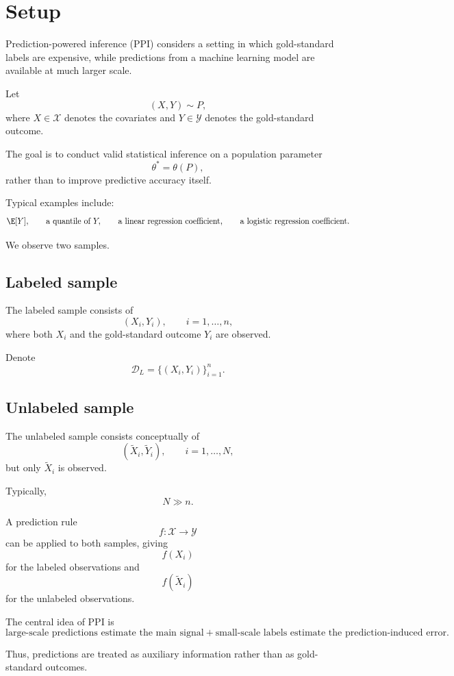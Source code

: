 \section{Setup}

Prediction-powered inference (PPI) considers a setting in which
gold-standard labels are expensive, while predictions from a machine
learning model are available at much larger scale.

Let
\[
(X,Y) \sim P,
\]
where $X \in \mathcal{X}$ denotes the covariates and $Y \in \mathcal{Y}$
denotes the gold-standard outcome.

The goal is to conduct valid statistical inference on a population
parameter
\[
\theta^* = \theta(P),
\]
rather than to improve predictive accuracy itself.

Typical examples include:
\[
\E[Y],
\qquad
\text{a quantile of } Y,
\qquad
\text{a linear regression coefficient},
\qquad
\text{a logistic regression coefficient}.
\]

We observe two samples.

\subsection{Labeled sample}

The labeled sample consists of
\[
(X_i,Y_i), \qquad i=1,\ldots,n,
\]
where both $X_i$ and the gold-standard outcome $Y_i$ are observed.

Denote
\[
\mathcal{D}_{L}
=
\{(X_i,Y_i)\}_{i=1}^n.
\]

\subsection{Unlabeled sample}

The unlabeled sample consists conceptually of
\[
(\widetilde X_i,\widetilde Y_i),
\qquad i=1,\ldots,N,
\]
but only $\widetilde X_i$ is observed.

Typically,
\[
N \gg n.
\]

A prediction rule
\[
f:\mathcal{X}\rightarrow\mathcal{Y}
\]
can be applied to both samples, giving
\[
f(X_i)
\]
for the labeled observations and
\[
f(\widetilde X_i)
\]
for the unlabeled observations.

The central idea of PPI is
\[
\boxed{
\text{large-scale predictions estimate the main signal}
+
\text{small-scale labels estimate the prediction-induced error}.
}
\]

Thus, predictions are treated as auxiliary information rather than as
gold-standard outcomes.

